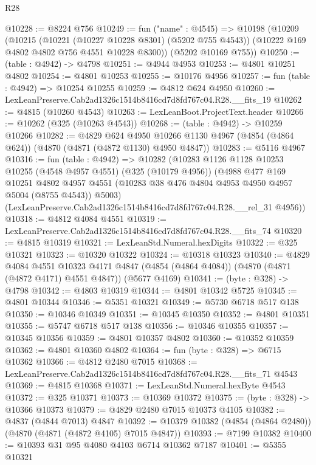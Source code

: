 \begin{lexlean}{R28}
\begin{coremodule}
@10228 := @8224 @756
@10249 := fun ("name" : @4545) =>
  @10198
    (@10209
      (@10215
        (@10221 (@10227 @10228 @8301) (@5202 @755 @4543))
        (@10222 @169 @4802 @4802 @756 @4551 @10228 @8300))
      (@5202 @10169 @755))
@10250 := (table : @4942) -> @4798
@10251 := @4944 @4953
@10253 := @4801 @10251 @4802
@10254 := @4801 @10253
@10255 := @10176 @4956
@10257 := fun (table : @4942) => @10254 @10255
@10259 := @4812 @624 @4950
@10260 := LexLeanPreserve.Cab2ad1326c1514b8416cd7d8fd767c04.R28.__fits_19
@10262 := @4815 (@10260 @4543)
@10263 := LexLeanBoot.ProjectText.header
@10266 := @10262 (@325 (@10263 @4543))
@10268 := (table : @4942) -> @10259 @10266
@10282 := @4829
    @624
    @4950
    @10266
    @1130
    @4967
    (@4854 (@4864 @624))
    (@4870 (@4871 (@4872 @1130) @4950 @4847))
@10283 := @5116 @4967
@10316 := fun (table : @4942) =>
  @10282
    (@10283
      @1126
      @1128
      @10253
      @10255
      (@4548 @4957 @4551)
      (@325 (@10179 @4956))
      (@4988
        @477
        @169
        @10251
        @4802
        @4957
        @4551
        (@10283 @38 @476 @4804 @4953 @4950 @4957 @5004 (@8755 @4543))
        @5003)
      (LexLeanPreserve.Cab2ad1326c1514b8416cd7d8fd767c04.R28.__rel_31 @4956))
@10318 := @4812 @4084 @4551
@10319 := LexLeanPreserve.Cab2ad1326c1514b8416cd7d8fd767c04.R28.__fits_74
@10320 := @4815 @10319
@10321 := LexLeanStd.Numeral.hexDigits
@10322 := @325 @10321
@10323 := @10320 @10322
@10324 := @10318 @10323
@10340 := @4829
    @4084
    @4551
    @10323
    @4171
    @4847
    (@4854 (@4864 @4084))
    (@4870 (@4871 (@4872 @4171) @4551 @4847))
    (@5677 @4169)
@10341 := (byte : @328) -> @4798
@10342 := @4803 @10319
@10344 := @4801 @10342 @5725
@10345 := @4801 @10344
@10346 := @5351 @10321
@10349 := @5730 @6718 @517 @138
@10350 := @10346 @10349
@10351 := @10345 @10350
@10352 := @4801 @10351
@10355 := @5747 @6718 @517 @138
@10356 := @10346 @10355
@10357 := @10345 @10356
@10359 := @4801 @10357 @4802
@10360 := @10352 @10359
@10362 := @4801 @10360 @4802
@10364 := fun (byte : @328) => @6715 @10362
@10366 := @4812 @2480 @7015
@10368 := LexLeanPreserve.Cab2ad1326c1514b8416cd7d8fd767c04.R28.__fits_71 @4543
@10369 := @4815 @10368
@10371 := LexLeanStd.Numeral.hexByte @4543
@10372 := @325 @10371
@10373 := @10369 @10372
@10375 := (byte : @328) -> @10366 @10373
@10379 := @4829 @2480 @7015 @10373 @4105
@10382 := @4837 (@4844 @7013) @4847
@10392 := @10379 @10382 (@4854 (@4864 @2480)) (@4870 (@4871 (@4872 @4105) @7015 @4847))
@10393 := @7199 @10382
@10400 := @10393 @31 @95 @4080 @4103 @6714 @10362 @7187
@10401 := @5355 @10321

\end{coremodule}
\end{lexlean}
